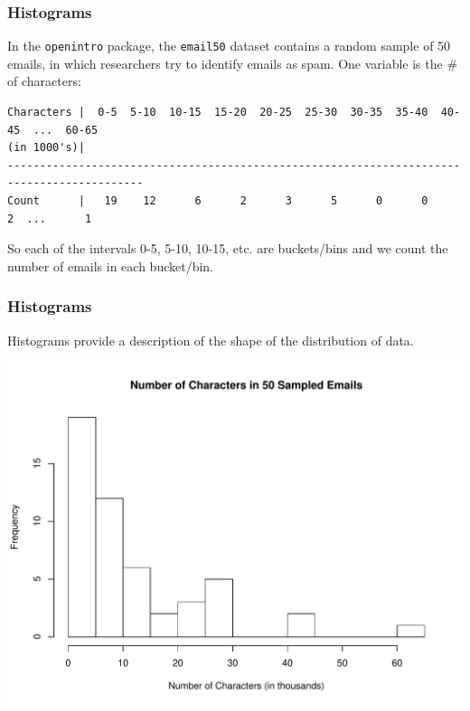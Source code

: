 \documentclass[handout]{beamer}
\newcommand{\blue}[1]{\textcolor{blue2}{#1}}
\begin{document}
\begin{frame}[fragile]
\frametitle{Histograms}
In the {\tt openintro} package, the {\tt email50} dataset contains a random sample of 50 emails, in which researchers try to identify emails as spam.  One variable is the \# of characters:

\vspace{0.25cm}

\begin{tiny}
\begin{verbatim}
Characters |  0-5  5-10  10-15  15-20  20-25  25-30  30-35  35-40  40-45  ...  60-65
(in 1000's)|
-------------------------------------------------------------------------------------------
Count      |   19    12      6      2      3      5      0      0      2  ...      1
\end{verbatim}
\end{tiny}

\vspace{0.25cm}

\pause So each of the intervals 0-5, 5-10, 10-15, etc. are \blue{buckets/bins} and we count the number of emails in each bucket/bin.  

\end{frame}



\begin{frame}[fragile]
\frametitle{Histograms}

Histograms provide a description of the shape of the \blue{distribution} of data.  

\begin{center}
\includegraphics[height=0.7\textheight]{figure/hist.pdf}
\end{center}

\end{frame}
\end{document}
